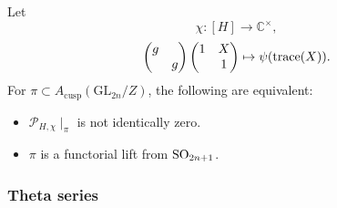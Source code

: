 \documentclass[reqno]{amsart} 
\numberwithin{theorem}{section}
\numberwithin{equation}{section}
\numberwithin{exercise}{section}
\begin{document}
\begin{example}
\begin{enumerate}[(a)]
\begin{equation*}
    \end{equation*}
    Let
    \begin{equation*}
      \chi :[H] \rightarrow \mathbb{C}^\times,
    \end{equation*}
    \begin{equation*}
      \begin{pmatrix}
        g        &  \\
                 & g \\
      \end{pmatrix}
      \begin{pmatrix}
        1        & X \\
                 & 1 \\
      \end{pmatrix}
      \mapsto \psi(\operatorname{trace}(X)).
    \end{equation*}
    For $\pi \subset A_{\mathrm{cusp}}(\mathrm{GL}_{2 n} / Z)$, the following are equivalent:
    \begin{itemize}
    \item $\mathcal{P}_{H, \chi} \mid_\pi$ is not identically zero.
    \item $\pi$ is a functorial lift from $\operatorname{SO}_{2 n + 1}$.
    \end{itemize}
  \end{enumerate}
\end{example}

\subsubsection{Theta series}\label{sec:cq6thpxagu}
\end{document}
